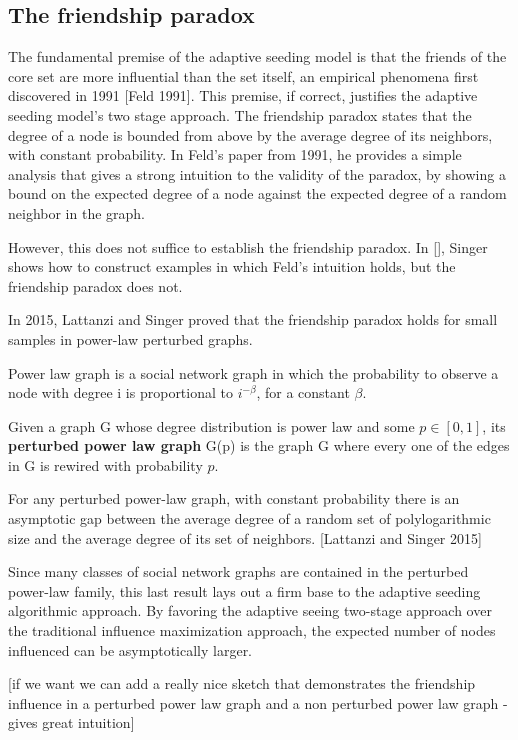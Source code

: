 \subsection{The friendship paradox}


The fundamental premise of the adaptive seeding model is that the friends
 of the core set are more influential than the set itself, an empirical
 phenomena first discovered in 1991 [Feld 1991].
 This premise, if correct, justifies the adaptive seeding model's two stage
 approach.
 The friendship paradox states that the degree of a node is bounded from
 above by the average degree of its neighbors, with constant probability.
 In Feld's paper from 1991, he provides a simple analysis that gives a strong
 intuition to the validity of the paradox, by showing a bound on the expected
 degree of a node against the expected degree of a random neighbor in the
 graph.

However, this does not suffice to establish the friendship paradox.
 In [], Singer shows how to construct examples in which Feld's intuition
 holds, but the friendship paradox does not.

In 2015, Lattanzi and Singer proved that the friendship paradox holds for
 small samples in power-law perturbed graphs.
 
\begin{definition}
Power law graph is a social network graph in which the probability to observe a node
 with degree i is proportional to $i^{-\beta}$, for a constant $\beta$.

\end{definition}

\begin{definition}

 Given a graph G whose degree distribution is power law and some $p\in [0,1]$, its \textbf{perturbed power law graph} G(p) is the graph G where every one of the edges in G is rewired with probability $p$.
\end{definition}

\begin{theoreme}

 For any perturbed power-law graph, with constant probability there is an
 asymptotic gap between the average degree of a random set of polylogarithmic
 size and the average degree of its set of neighbors.
 [Lattanzi and Singer 2015]
\end{theoreme}


Since many classes of social network graphs are contained in the perturbed
 power-law family, this last result lays out a firm base to the adaptive
 seeding algorithmic approach.
 By favoring the adaptive seeing two-stage approach over the traditional
 influence maximization approach, the expected number of nodes influenced
 can be asymptotically larger.



[if we want we can add a really nice sketch that demonstrates the friendship
 influence in a perturbed power law graph and a non perturbed power law
 graph - gives great intuition]



